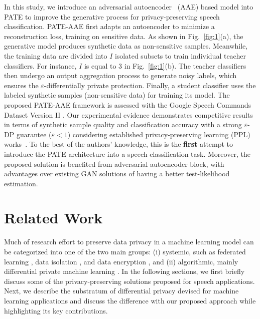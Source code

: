 \documentclass[a4paper]{article}
\begin{document}
In this study, we introduce an adversarial autoencoder~\cite{makhzani2015adversarial} (AAE) based model into PATE to improve the generative process for privacy-preserving speech classification. PATE-AAE first adapts an autoencoder to minimize a reconstruction loss, training on sensitive data. As shown in Fig.~\ref{fig:1}(a), the generative model produces synthetic data as non-sensitive samples. Meanwhile, the training data are divided into $I$ isolated subsets to train individual teacher classifiers. For instance, $I$ is equal to $3$ in Fig.~\ref{fig:1}(b). The teacher classifiers then undergo an output aggregation process to generate noisy labels, which ensures the $\varepsilon$-differentially private protection. Finally, a student classifier uses the labeled synthetic samples (non-sensitive data) for training its model. The proposed PATE-AAE framework is assessed with the Google Speech Commands Dataset Version II \cite{warden2018speech}. Our experimental evidence demonstrates competitive results in terms of synthetic sample quality and classification accuracy with a strong $\varepsilon$-DP guarantee ($\varepsilon<1$) considering established privacy-preserving learning (PPL) works~\cite{jordon2019pate, xie2018differentially}. To the best of the authors' knowledge, this is the \textbf{first} attempt to introduce the PATE architecture into a speech classification task. Moreover, the proposed solution is benefited from adversarial autoencoder block, with advantages over existing GAN solutions \cite{fredrikson2015model, jordon2019pate} of having a better test-likelihood estimation.






\section{Related Work}
Much of research effort to preserve data privacy in a machine learning model can be categorized into one of the two main groups: (i) systemic, such as federated learning \cite{leroy2019federated}, data isolation \cite{yang2020decentralizing}, and data encryption \cite{glackin2017privacy}, and (ii) algorithmic, mainly differential private machine learning \cite{abadi2016deep}. In the following sections, we first briefly discuss some of the privacy-preserving solutions proposed for speech applications. Next, we describe the substratum of differential privacy devised for machine learning applications and discuss the difference with our proposed approach while highlighting its key contributions.
\end{document}

